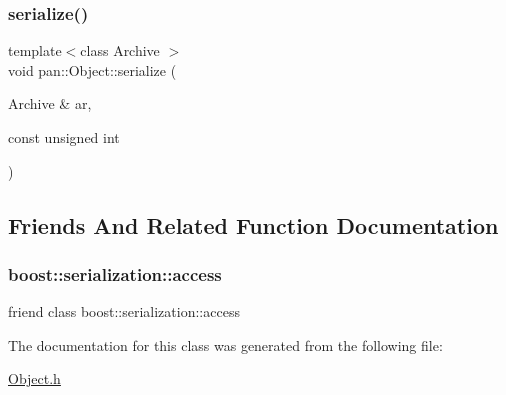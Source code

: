 \subsubsection{\texorpdfstring{serialize()}{serialize()}}
{\footnotesize\ttfamily template$<$class Archive $>$ \\
void pan\+::\+Object\+::serialize (\begin{DoxyParamCaption}\item[{Archive \&}]{ar,  }\item[{const unsigned}]{int }\end{DoxyParamCaption})\hspace{0.3cm}{\ttfamily [inline]}}



\subsection{Friends And Related Function Documentation}
\mbox{\label{classpan_1_1_object_ac98d07dd8f7b70e16ccb9a01abf56b9c}} 
\subsubsection{\texorpdfstring{boost\+::serialization\+::access}{boost::serialization::access}}
{\footnotesize\ttfamily friend class boost\+::serialization\+::access\hspace{0.3cm}{\ttfamily [friend]}}



The documentation for this class was generated from the following file\+:\begin{DoxyCompactItemize}
\item 
\hyperlink{_object_8h}{Object.\+h}\end{DoxyCompactItemize}
